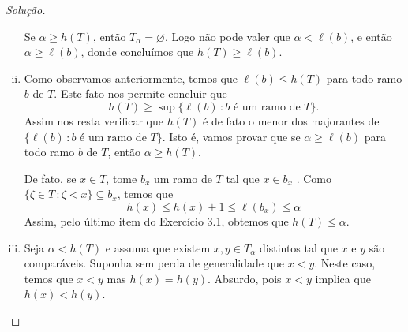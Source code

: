 \documentclass[a4paper]{article}
\begin{document}
\begin{proof}[Solução]
\begin{enumerate}[(i)]
Se \(\alpha\geq h(T)\), então \(T_\alpha=\varnothing\). Logo não pode valer que
\(\alpha<\ell(b)\), e então \(\alpha\geq\ell(b)\), donde concluímos que \(h(T)\geq\ell(b)\).


        
      \item Como observamos anteriormente, temos que  \(\ell (b)\leq h(T)\) para
        todo ramo \(b\) de \(T\). Este fato nos permite concluir que
        \[h(T)\geq\sup\{\ell(b)\,\colon b \text{ é um ramo de } T\}.\]
        Assim nos resta verificar que \(h(T)\) é de fato o menor dos majorantes
         de \(\{\ell(b)\,\colon b \text{ é um ramo de } T\}\). Isto é, vamos
         provar que se \(\alpha\geq  \ell (b)\)
        para todo ramo \(b\) de \(T\), então \(\alpha\geq h(T)\).
        
        De fato, se \(x\in T\), tome \(b_x\) um ramo de \(T\) tal que \(x\in
        b_x\) . Como \(\{\zeta\in T\,\colon\zeta<x\}\subseteq b_x\), temos
        que \[h(x)\leq h(x)+1\leq
\ell(b_x)\leq\alpha\]
        Assim, pelo último item do Exercício 3.1, obtemos que \(h(T)\leq\alpha\).
        

      \item Seja \(\alpha < h(T)\) e assuma que existem \(x,y\in T_\alpha\)
          distintos tal que \(x\) e \(y\) são comparáveis.
          Suponha sem perda de generalidade que
          \(x<y\). Neste caso, temos que \(x<y\) mas \(h(x)=h(y)\). Absurdo, pois
          \(x<y\) implica que \(h(x) < h(y)\).\qedhere

    \end{enumerate}
  \end{proof}
\end{document}
